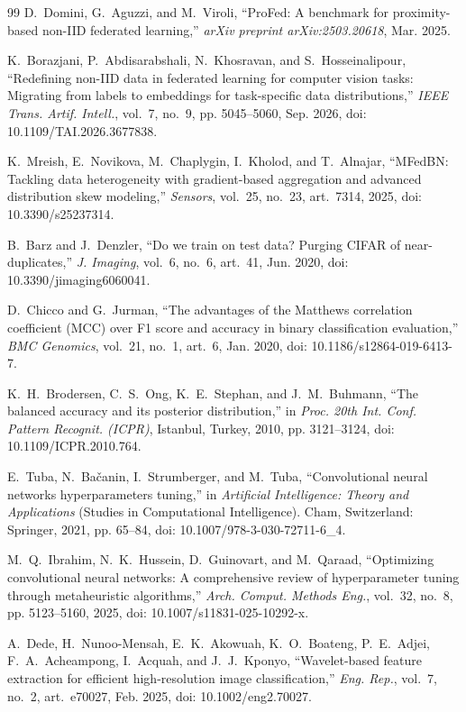 \documentclass[journal]{IEEEtran}
\begin{document}
\begin{thebibliography}{99}
D.~Domini, G.~Aguzzi, and M.~Viroli, ``ProFed: A benchmark for proximity-based non-IID federated learning,'' \emph{arXiv preprint arXiv:2503.20618}, Mar. 2025.

K.~Borazjani, P.~Abdisarabshali, N.~Khosravan, and S.~Hosseinalipour, ``Redefining non-IID data in federated learning for computer vision tasks: Migrating from labels to embeddings for task-specific data distributions,'' \emph{IEEE Trans. Artif. Intell.}, vol.~7, no.~9, pp. 5045--5060, Sep. 2026, doi: 10.1109/TAI.2026.3677838.

K.~Mreish, E.~Novikova, M.~Chaplygin, I.~Kholod, and T.~Alnajar, ``MFedBN: Tackling data heterogeneity with gradient-based aggregation and advanced distribution skew modeling,'' \emph{Sensors}, vol.~25, no.~23, art.~7314, 2025, doi: 10.3390/s25237314.

B.~Barz and J.~Denzler, ``Do we train on test data? Purging CIFAR of near-duplicates,'' \emph{J. Imaging}, vol.~6, no.~6, art.~41, Jun. 2020, doi: 10.3390/jimaging6060041.

D.~Chicco and G.~Jurman, ``The advantages of the Matthews correlation coefficient (MCC) over F1 score and accuracy in binary classification evaluation,'' \emph{BMC Genomics}, vol.~21, no.~1, art.~6, Jan. 2020, doi: 10.1186/s12864-019-6413-7.

K.~H.~Brodersen, C.~S.~Ong, K.~E.~Stephan, and J.~M.~Buhmann, ``The balanced accuracy and its posterior distribution,'' in \emph{Proc. 20th Int. Conf. Pattern Recognit. (ICPR)}, Istanbul, Turkey, 2010, pp. 3121--3124, doi: 10.1109/ICPR.2010.764.

E.~Tuba, N.~Ba\v{c}anin, I.~Strumberger, and M.~Tuba, ``Convolutional neural networks hyperparameters tuning,'' in \emph{Artificial Intelligence: Theory and Applications} (Studies in Computational Intelligence). Cham, Switzerland: Springer, 2021, pp. 65--84, doi: 10.1007/978-3-030-72711-6\_4.

M.~Q.~Ibrahim, N.~K.~Hussein, D.~Guinovart, and M.~Qaraad, ``Optimizing convolutional neural networks: A comprehensive review of hyperparameter tuning through metaheuristic algorithms,'' \emph{Arch. Comput. Methods Eng.}, vol.~32, no.~8, pp. 5123--5160, 2025, doi: 10.1007/s11831-025-10292-x.

A.~Dede, H.~Nunoo-Mensah, E.~K.~Akowuah, K.~O.~Boateng, P.~E.~Adjei, F.~A.~Acheampong, I.~Acquah, and J.~J.~Kponyo, ``Wavelet-based feature extraction for efficient high-resolution image classification,'' \emph{Eng. Rep.}, vol.~7, no.~2, art.~e70027, Feb. 2025, doi: 10.1002/eng2.70027.


\end{thebibliography}
\end{document}
